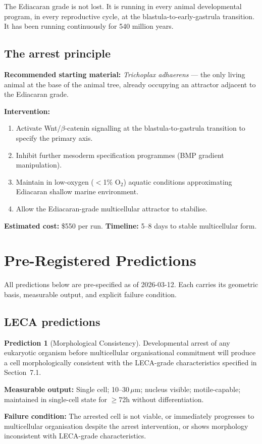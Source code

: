 \documentclass[12pt, a4paper]{article}
\theoremstyle{definition}
\newtheorem{prediction}{Prediction}[section]
\theoremstyle{remark}
\begin{document}
The Ediacaran grade is not lost. It is running in every
animal developmental program, in every reproductive cycle,
at the blastula-to-early-gastrula transition. It has been
running continuously for 540 million years.

\subsection{The arrest principle}

\textbf{Recommended starting material:}
\textit{Trichoplax adhaerens} --- the only living animal at
the base of the animal tree, already occupying an attractor
adjacent to the Ediacaran grade.

\textbf{Intervention:}
\begin{enumerate}[label=\arabic*.]
  \item Activate Wnt/$\beta$-catenin signalling at the
        blastula-to-gastrula transition to specify the
        primary axis.
  \item Inhibit further mesoderm specification programmes
        (BMP gradient manipulation).
  \item Maintain in low-oxygen ($<$1\% O$_2$) aquatic
        conditions approximating Ediacaran shallow marine
        environment.
  \item Allow the Ediacaran-grade multicellular attractor
        to stabilise.
\end{enumerate}

\textbf{Estimated cost:} \$550 per run.
\textbf{Timeline:} 5--8 days to stable multicellular form.

\section{Pre-Registered Predictions}

\noindent All predictions below are pre-specified as of
2026-03-12. Each carries its geometric basis, measurable
output, and explicit failure condition.

\subsection{LECA predictions}

\begin{prediction}[Morphological Consistency]
Developmental arrest of any eukaryotic organism before
multicellular organisational commitment will produce a cell
morphologically consistent with the LECA-grade
characteristics specified in Section~7.1.

\textbf{Measurable output:} Single cell; 10--30\,$\mu$m;
nucleus visible; motile-capable; maintained in single-cell
state for $\geq$72h without differentiation.

\textbf{Failure condition:} The arrested cell is not viable,
or immediately progresses to multicellular organisation
despite the arrest intervention, or shows morphology
inconsistent with LECA-grade characteristics.
\end{prediction}
\end{document}

